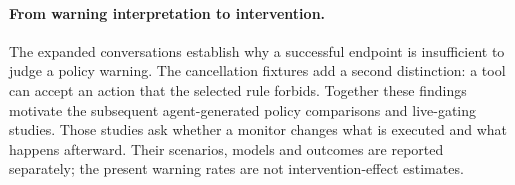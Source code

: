 \paragraph{From warning interpretation to intervention.}
The expanded conversations establish why a successful endpoint is insufficient to judge a policy warning. The cancellation fixtures add a second distinction: a tool can accept an action that the selected rule forbids. Together these findings motivate the subsequent agent-generated policy comparisons and live-gating studies. Those studies ask whether a monitor changes what is executed and what happens afterward. Their scenarios, models and outcomes are reported separately; the present warning rates are not intervention-effect estimates.
